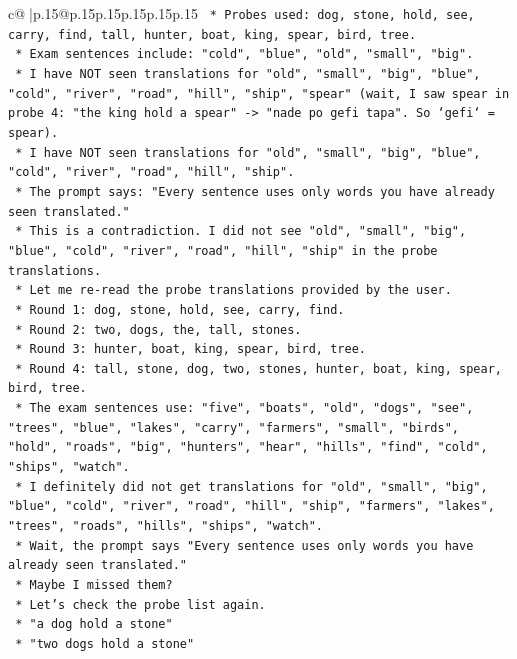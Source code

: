 \documentclass{article}
\begin{document}
{\begin{supertabular}{c@{$\;$}|p{.15\linewidth}@{}p{.15\linewidth}p{.15\linewidth}p{.15\linewidth}p{.15\linewidth}p{.15\linewidth}}
{{{\texttt{    *   Probes used: dog, stone, hold, see, carry, find, tall, hunter, boat, king, spear, bird, tree.} \\
\texttt{    *   Exam sentences include: "cold", "blue", "old", "small", "big".} \\
\texttt{    *   I have NOT seen translations for "old", "small", "big", "blue", "cold", "river", "road", "hill", "ship", "spear" (wait, I saw spear in probe 4: "the king hold a spear" {-}> "nade po gefi tapa". So `gefi` = spear).} \\
\texttt{    *   I have NOT seen translations for "old", "small", "big", "blue", "cold", "river", "road", "hill", "ship".} \\
\texttt{    *   The prompt says: "Every sentence uses only words you have already seen translated."} \\
\texttt{    *   This is a contradiction. I did not see "old", "small", "big", "blue", "cold", "river", "road", "hill", "ship" in the probe translations.} \\
\texttt{    *   Let me re{-}read the probe translations provided by the user.} \\
\texttt{        *   Round 1: dog, stone, hold, see, carry, find.} \\
\texttt{        *   Round 2: two, dogs, the, tall, stones.} \\
\texttt{        *   Round 3: hunter, boat, king, spear, bird, tree.} \\
\texttt{        *   Round 4: tall, stone, dog, two, stones, hunter, boat, king, spear, bird, tree.} \\
\texttt{    *   The exam sentences use: "five", "boats", "old", "dogs", "see", "trees", "blue", "lakes", "carry", "farmers", "small", "birds", "hold", "roads", "big", "hunters", "hear", "hills", "find", "cold", "ships", "watch".} \\
\texttt{    *   I definitely did not get translations for "old", "small", "big", "blue", "cold", "river", "road", "hill", "ship", "farmers", "lakes", "trees", "roads", "hills", "ships", "watch".} \\
\texttt{    *   Wait, the prompt says "Every sentence uses only words you have already seen translated."} \\
\texttt{    *   Maybe I missed them?} \\
\texttt{    *   Let's check the probe list again.} \\
\texttt{        *   "a dog hold a stone"} \\
\texttt{        *   "two dogs hold a stone"} \\
}}}
\end{supertabular}}
\end{document}
